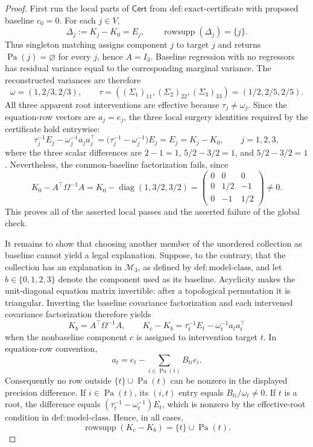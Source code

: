 \documentclass{article}
\begin{document}
\begin{proof}
First run the local parts of \(\mathsf{Cert}\) from
\(\mathrm{def:exact\mbox{-}certificate}\) with proposed baseline \(c_0=0\).  For
each \(j\in V\),
\[
 \Delta_j:=K_j-K_0=E_j,
 \qquad \operatorname{rowsupp}(\Delta_j)=\{j\}.
\]
Thus singleton matching assigns component \(j\) to target \(j\) and returns
\(\operatorname{Pa}(j)=\varnothing\) for every \(j\), hence \(A=I_3\).
Baseline regression with no regressors has residual variance equal to the
corresponding marginal variance.  The reconstructed variances are therefore
\[
 \omega=(1,2/3,2/3),
 \qquad
 \tau=((\Sigma_1)_{11},(\Sigma_2)_{22},(\Sigma_3)_{33})=(1/2,2/5,2/5).
\]
All three apparent root interventions are effective because
\(\tau_j\neq\omega_j\).  Since the equation-row vectors are
\(a_j=e_j\), the three local surgery identities required by the certificate
hold entrywise:
\[
 \tau_j^{-1}E_j-\omega_j^{-1}a_ja_j^{\top}
 =\bigl(\tau_j^{-1}-\omega_j^{-1}\bigr)E_j
 =E_j
 =K_j-K_0,
 \qquad j=1,2,3,
\]
where the three scalar differences are
\(2-1=1\), \(5/2-3/2=1\), and \(5/2-3/2=1\).
Nevertheless, the common-baseline factorization fails, since
\[
 K_0-A^{\top}\Omega^{-1}A
 =K_0-\operatorname{diag}(1,3/2,3/2)
 =\begin{pmatrix}0&0&0\\0&1/2&-1\\0&-1&1/2\end{pmatrix}\neq0.
\]
This proves all of the asserted local passes and the asserted failure of the
global check.

It remains to show that choosing another member of the unordered collection
as baseline cannot yield a legal explanation.  Suppose, to the contrary, that
the collection has an explanation in \(\mathcal M_3\), as defined by
\(\mathrm{def:model\mbox{-}class}\), and let \(b\in\{0,1,2,3\}\) denote the
component used as its baseline.  Acyclicity makes the unit-diagonal equation
matrix invertible: after a topological permutation it is triangular.  Inverting
the baseline covariance factorization and each intervened covariance
factorization therefore yields
\[
 K_b=A^{\top}\Omega^{-1}A,
 \qquad
 K_c-K_b=\tau_t^{-1}E_t-\omega_t^{-1}a_ta_t^{\top}
\]
when the nonbaseline component \(c\) is assigned to intervention target
\(t\).  In equation-row convention,
\[
 a_t=e_t-\sum_{i\in\operatorname{Pa}(t)}B_{ti}e_i.
\]
Consequently no row outside
\(\{t\}\cup\operatorname{Pa}(t)\) can be nonzero in the displayed precision
difference.  If \(i\in\operatorname{Pa}(t)\), its \((i,t)\) entry equals
\(B_{ti}/\omega_t\neq0\).  If \(t\) is a root, the difference equals
\((\tau_t^{-1}-\omega_t^{-1})E_t\), which is nonzero by the effective-root
condition in \(\mathrm{def:model\mbox{-}class}\).  Hence, in all cases,
\[
 \operatorname{rowsupp}(K_c-K_b)=\{t\}\cup\operatorname{Pa}(t).
 \tag{1}
\]


\end{proof}
\end{document}
